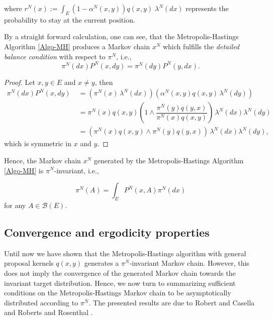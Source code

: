 where $ r^{N}(x):= \int_{E} \left( 1 - \alpha^{N}(x,y) \right) q(x,y) \; \lambda^{N}(dx) $ represents the probability to stay at the current position.

By a straight forward calculation, one can see, that the Metropolis-Hastings Algorithm \ref{Algo-MH} produces a Markov chain $ x^{N} $ which fulfills the \emph{detailed balance condition} with respect to $ \pi^{N} $, i.e.,
\begin{equation}
 \pi^{N}(dx) P^{N}(x,dy) = \pi^{N}(dy) P^{N}(y,dx).
\end{equation}

\begin{proof}
 Let $ x, y \in E $ and $ x \ne y $, then
 \begin{align*}
  \pi^{N}(dx) P^{N}(x,dy) & \; = \left( \pi^{N}(x) \, \lambda^{N}(dx) \right)  \left( \alpha^{N}(x,y) q(x,y) \, \lambda^{N}(dy) \right) \\
  & \; = \pi^{N}(x)  q(x,y) \left( 1 \wedge \dfrac{\pi^{N}(y) q(y,x) }{\pi^{N}(x) q(x,y)} \right) \, \lambda^{N}(dx) \lambda^{N}(dy) \\
  & \; = \left( \pi^{N}(x)  q(x,y) \wedge \pi^{N}(y) q(y,x) \right) \, \lambda^{N}(dx) \lambda^{N}(dy),
 \end{align*}
 which is symmetric in $x$ and $y$.

\end{proof}

Hence, the Markov chain $ x^{N} $ generated by the Metropolis-Hastings Algorithm \ref{Algo-MH} is $ \pi^{N} $-invariant, i.e.,

\begin{equation}
 \pi^{N} (A) = \int_{E} P^{N}(x,A) \pi^{N}(dx)
\end{equation}
for any $ A \in \mathcal{B}(E) $.



\subsection{Convergence and ergodicity properties}
\label{MH-ConvergenceProperties}


Until now we have shown that the Metropolis-Hastings algorithm with general proposal kernels $q(x,y)$ generates a $ \pi^{N} $-invariant Markov chain. However, this does not imply the convergence of the generated Markov chain towards the invariant target distribution. Hence, we now turn to summarizing sufficient conditions on the Metropolis-Hastings Markov chain to be asymptotically distributed according to $ \pi^{N} $. The presented results are due to Robert and Casella \autocite{Robert2005} and Roberts and Rosenthal \autocite{Rosenthal2004}. 

